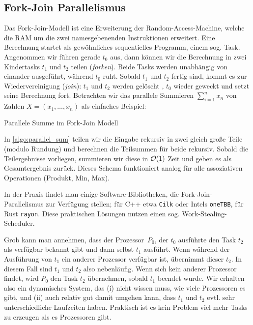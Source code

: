 \subsection{Fork-Join Parallelismus}
Das Fork-Join-Modell ist eine Erweiterung der Random-Access-Machine, welche die RAM um die zwei namesgebenenden Instruktionen erweitert.
Eine Berechnung startet als gewöhnliches sequentielles Programm, einem sog. Task.
Angenommen wir führen gerade $t_0$ aus, dann können wir die Berechnung in zwei \glqq Kindertasks\grqq{} $t_1$ und $t_2$ teilen  (\emph{forken}).
Beide Tasks werden unabhängig von einander ausgeführt, während $t_0$ ruht.
Sobald $t_1$ und $t_2$ fertig sind, kommt es zur Wiedervereinigung  (\emph{join}):
$t_1$ und $t_2$ werden \glqq gelöscht \grqq, $t_0$ wieder geweckt und setzt seine Berechnung fort.
Betrachten wir das parallele Summieren $\sum_{i=1}^n x_n$ von Zahlen $X = (x_1, \ldots, x_n)$ als einfaches Beispiel:

\begin{algorithm}
    \caption{Parallele Summe im Fork-Join Modell}
    \label{algo:parallel_sum}
\end{algorithm}

In \cref{algo:parallel_sum} teilen wir die Eingabe rekursiv in zwei gleich große Teile (modulo Rundung) und berechnen die Teilsummen für beide rekursiv.
Sobald die Teilergebnisse vorliegen, summieren wir diese in $\mathcal{O}\!\left(1\right)$ Zeit und geben es als Gesamtergebnis zurück.
Dieses Schema funktioniert analog für alle assoziativen Operationen (\zB Produkt, Min, Max).

In der Praxis findet man einige Software-Bibliotheken, die Fork-Join-Parallelismus zur Verfügung stellen;
für C++ etwa \texttt{Cilk} oder Intels \texttt{oneTBB}, für Rust \texttt{rayon}.
Diese praktischen Lösungen nutzen einen sog. Work-Stealing-Scheduler.

Grob  kann man annehmen, dass der Prozessor~$P_0$, der $t_0$ ausführte den Task $t_2$ als verfügbar bekannt gibt und dann selbst $t_1$ ausführt.
Wenn während der Ausführung von $t_1$ ein anderer Prozessor verfügbar ist, übernimmt dieser $t_2$.
In diesem Fall sind $t_1$ und $t_2$ also nebenläufig.
Wenn sich kein anderer Prozessor findet, wird $P_0$ den Task $t_2$ übernehmen, sobald $t_1$ beendet wurde.
Wir erhalten also ein dynamisches System, das (i) nicht wissen muss, wie viele Prozessoren es gibt, und (ii) auch relativ gut damit umgehen kann, dass $t_1$ und $t_2$ evtl. sehr unterschiedliche Laufzeiten haben.
Praktisch ist es kein Problem viel mehr Tasks zu erzeugen als es Prozessoren gibt.


